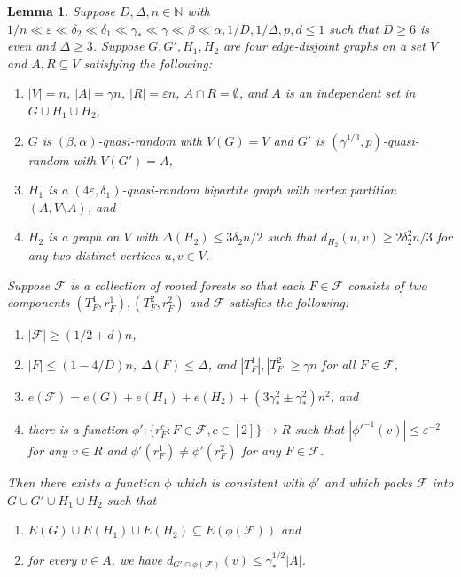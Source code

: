 \documentclass[a4paper, 11pt, reqno]{amsart}
\newtheorem{lemma}[definition]{Lemma}
\numberwithin{equation}{section}
\newcommand{\1}{{\rm 1\hspace*{-0.4ex}%
\rule{0.1ex}{1.52ex}\hspace*{0.2ex}}}
\newcommand{\N}{\mathbb N}
\newcommand{\cF}{\mathcal{F}}
\renewcommand{\epsilon}{\varepsilon}
\newcommand{\sub}{\subseteq}
\begin{document}
\begin{lemma}\label{lem: iteration}
Suppose $D,\Delta,n\in \N$ with  $1/n \ll \epsilon \ll  \delta_2 \ll \delta_1 \ll \gamma_* \ll  \gamma \ll \beta\ll \alpha, 1/D, 1/\Delta,p,d\leq 1$ 
such that $D\geq 6$ is even and $\Delta\geq 3$. 
Suppose $G, G', H_1, H_2$ are four edge-disjoint graphs on a set $V$ and $A,R \sub V$ satisfying the following:
\begin{enumerate}[label=(g\arabic*)]
\item\label{item:G1} $|V|=n$, $|A|=\gamma n$, $|R|= \epsilon n$, $A\cap R=\emptyset$, and $A$ is an independent set in $G \cup H_1 \cup H_2$,
\item\label{item:G2} $G$ is $(\beta,\alpha)$-quasi-random with $V(G)=V$ and $G'$ is $(\gamma^{1/3},p)$-quasi-random with $V(G')= A$,
\item\label{item:G3} $H_1$ is a $(4\epsilon,\delta_1)$-quasi-random bipartite graph with vertex partition $(A,V\setminus A)$, and
\item\label{item:G4} $H_2$ is a graph on $V$ with $\Delta(H_2)\leq 3\delta_2 n/2$ such that $d_{H_2}(u,v)\geq 2\delta_2^2 n/3$ for any two distinct vertices $u,v \in V$.
\end{enumerate}
Suppose $\cF$ is a collection of rooted forests so that each $F\in \cF$ consists of two components $(T_F^1,r^1_F), (T_F^2,r^2_F)$ and $\cF$ satisfies the following:
\begin{enumerate}[label=(f\arabic*)]
\item\label{item:T1} $|\cF| \geq  (1/2 + d)n $,
\item\label{item:T2} $|F|\leq (1- {4}/{D}) n$, $\Delta(F)\leq \Delta$, and $|T_F^1|, |T_F^2| \geq \gamma n$ for all $F\in \cF$,
\item\label{item:T3} $ e(\cF) = e(G)+e(H_1)+e(H_2) + (3\gamma_*^2 \pm \gamma_*^2 )n^2$, and
\item\label{item:T4} there is a function $\phi':\{r^c_F: F\in \cF, c\in [2]\}\to R$ such that $|\phi'^{-1}(v)| \leq \epsilon^{-2}$ for any $v\in R$ and $\phi'(r^1_F)\neq \phi'(r^2_F)$ for any $F\in \cF$.
\end{enumerate}
Then there exists a function $\phi$ which is consistent with $\phi'$ and which packs $\cF$ into $G\cup G'\cup H_1\cup H_2$ such that
\begin{enumerate}[label=($\Phi$\arabic*)]
\item\label{item:Phi1} $E(G)\cup E(H_1)\cup E(H_2) \sub E(\phi(\cF))$ and
\item\label{item:Phi2} for every $v\in A$, we have $d_{G'\cap \phi(\cF)}(v) \leq \gamma_*^{1/2}|A|$.
\end{enumerate}
\end{lemma}
\end{document}
